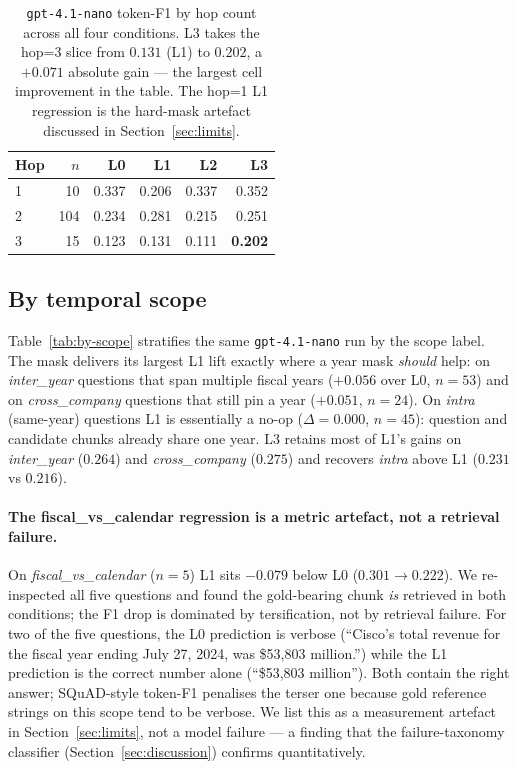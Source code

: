 \documentclass[11pt]{article}
\begin{document}
\begin{table}[h]
\centering
\small
\begin{tabular}{lr rrrr}
\toprule
Hop & $n$ & L0 & L1 & L2 & L3 \\
\midrule
1   &  10 & 0.337 & 0.206 & 0.337 & 0.352 \\
2   & 104 & 0.234 & 0.281 & 0.215 & 0.251 \\
3   &  15 & 0.123 & 0.131 & 0.111 & \textbf{0.202} \\
\bottomrule
\end{tabular}
\caption{\texttt{gpt-4.1-nano} token-F1 by hop count across all four
conditions. L3 takes the hop=3 slice from $0.131$ (L1) to $0.202$, a
$+0.071$ absolute gain --- the largest cell improvement in the table.
The hop=1 L1 regression is the hard-mask artefact discussed in
Section~\ref{sec:limits}.}
\label{tab:by-hop}
\end{table}

\subsection{By temporal scope}
\label{sec:r-scope}
Table~\ref{tab:by-scope} stratifies the same \texttt{gpt-4.1-nano} run
by the scope label. The mask delivers its largest L1 lift exactly
where a year mask \emph{should} help: on \textit{inter\_year}
questions that span multiple fiscal years ($+0.056$ over L0, $n=53$)
and on \textit{cross\_company} questions that still pin a year
($+0.051$, $n=24$). On \textit{intra} (same-year) questions L1 is
essentially a no-op ($\Delta=0.000$, $n=45$): question and candidate
chunks already share one year. L3 retains most of L1's gains on
\textit{inter\_year} ($0.264$) and \textit{cross\_company} ($0.275$)
and recovers \textit{intra} above L1 ($0.231$ vs $0.216$).

\paragraph{The fiscal\_vs\_calendar regression is a metric artefact, not a retrieval failure.}
On \textit{fiscal\_vs\_calendar} ($n=5$) L1 sits $-0.079$ below L0
($0.301\!\to\!0.222$). We re-inspected all five questions and found
the gold-bearing chunk \emph{is} retrieved in both conditions; the F1
drop is dominated by tersification, not by retrieval failure. For two
of the five questions, the L0 prediction is verbose
(``Cisco's total revenue for the fiscal year ending July 27, 2024,
was \$53,803 million.'') while the L1 prediction is the correct
number alone (``\$53,803 million''). Both contain the right answer;
SQuAD-style token-F1 penalises the terser one because gold reference
strings on this scope tend to be verbose. We list this as a
measurement artefact in Section~\ref{sec:limits}, not a model
failure --- a finding that the failure-taxonomy classifier
(Section~\ref{sec:discussion}) confirms quantitatively.
\end{document}
